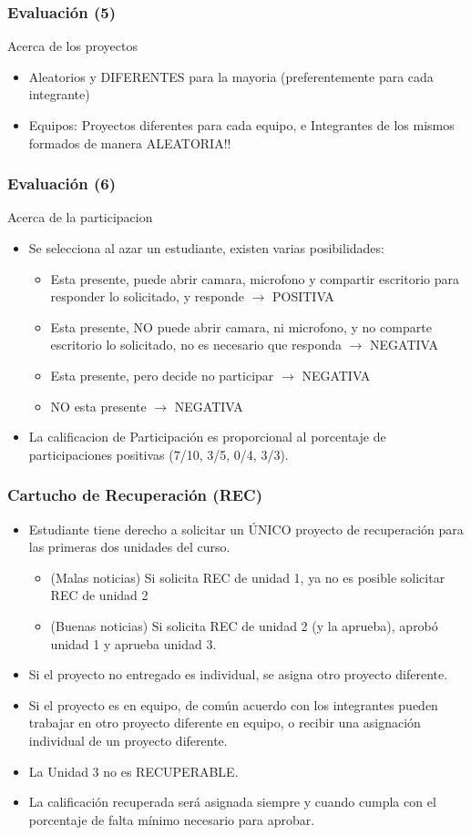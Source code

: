 \documentclass[aspectratio=169]{beamer}
\begin{document}
\begin{frame}
\frametitle{Evaluación (5)}
Acerca de los proyectos
\begin{itemize}
\item Aleatorios y DIFERENTES para la mayoria (preferentemente para cada integrante)
\item Equipos: Proyectos diferentes para cada equipo, e Integrantes de los mismos formados de manera ALEATORIA!!
\end{itemize}
\end{frame}

\begin{frame}
\frametitle{Evaluación (6)}
Acerca de la participacion
\begin{itemize}
\item Se selecciona al azar un estudiante, existen varias posibilidades:
\begin{itemize}
\item Esta presente, puede abrir camara, microfono y compartir escritorio para responder lo solicitado, y responde   $\rightarrow$  POSITIVA
\item Esta presente, NO puede abrir camara, ni microfono, y no comparte escritorio lo solicitado, no es necesario que responda  $\rightarrow$ NEGATIVA
\item Esta presente, pero decide no participar $\rightarrow$ NEGATIVA
\item NO esta presente $\rightarrow$ NEGATIVA
\end{itemize}
\item La calificacion de Participación es proporcional al porcentaje de participaciones positivas (7/10, 3/5, 0/4, 3/3). 
\end{itemize}
\end{frame}


\begin{frame}
\frametitle{Cartucho de Recuperación (REC)}
\begin{itemize}
\item Estudiante tiene derecho a solicitar un ÚNICO proyecto de recuperación para las primeras dos unidades del curso. 
\begin{itemize}
\item (Malas noticias) Si solicita REC de unidad 1, ya no es posible solicitar REC de unidad 2 
\item (Buenas noticias) Si solicita REC de unidad 2 (y la aprueba), aprobó unidad 1 y aprueba unidad 3.
\end{itemize}
\item Si el proyecto no entregado es individual, se asigna otro proyecto diferente.
\item Si el proyecto es en equipo, de común acuerdo con los integrantes pueden trabajar en otro proyecto diferente en equipo, o recibir una asignación individual de un proyecto diferente.
\item La Unidad 3 no es RECUPERABLE. 
\item La calificación recuperada será asignada siempre y cuando cumpla con el porcentaje de falta mínimo necesario para aprobar. 
\end{itemize}
\end{frame}
\end{document}
